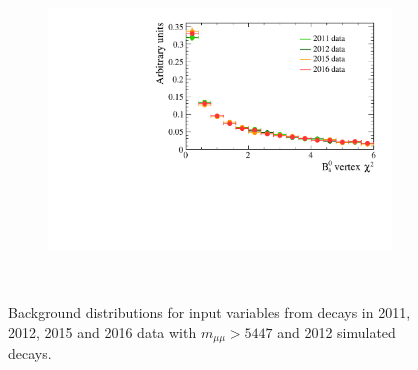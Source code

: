 \begin{figure}
 \begin{subfigure}[b]{0.48\textwidth}
        \includegraphics[width=\textwidth]{./Figs/Appendix1/bkgnd_vertex.pdf}
        \caption{ }
        \label{fig:BDTsig}
    \end{subfigure}
    ~ %
 



    \caption{Background distributions for input variables from \bbbarmumux decays in 2011, 2012, 2015 and 2016 data with $m_{\mu \mu} > 5447$ \mevcc and 2012 simulated \bbbarmumux decays.}
    \label{fig:signalvars}
\end{figure}
